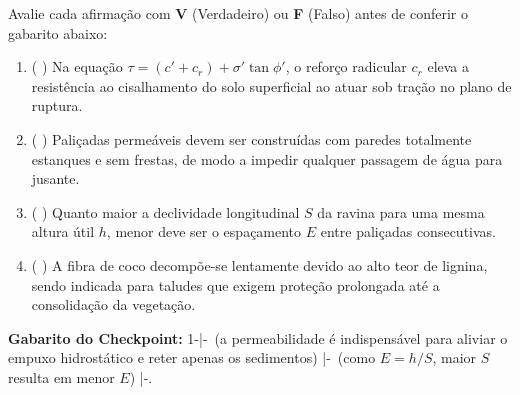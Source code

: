 \begin{boxTeste}
Avalie cada afirmação com \textbf{V} (Verdadeiro) ou \textbf{F} (Falso) antes de conferir o gabarito abaixo:
\begin{enumerate}[leftmargin=1.6em, itemsep=3pt]
  \item ( \quad ) Na equação $\tau = (c' + c_r) + \sigma'\tan\phi'$, o reforço radicular $c_r$ eleva a resistência ao cisalhamento do solo superficial ao atuar sob tração no plano de ruptura.
  \item ( \quad ) Paliçadas permeáveis devem ser construídas com paredes totalmente estanques e sem frestas, de modo a impedir qualquer passagem de água para jusante.
  \item ( \quad ) Quanto maior a declividade longitudinal $S$ da ravina para uma mesma altura útil $h$, menor deve ser o espaçamento $E$ entre paliçadas consecutivas.
  \item ( \quad ) A fibra de coco decompõe-se lentamente devido ao alto teor de lignina, sendo indicada para taludes que exigem proteção prolongada até a consolidação da vegetação.
\end{enumerate}
\vspace{4pt}
{\footnotesize\textbf{Gabarito do Checkpoint:} 1-\V \quad|-\F\ (a permeabilidade é indispensável para aliviar o empuxo hidrostático e reter apenas os sedimentos) \quad|-\V\ (como $E = h/S$, maior $S$ resulta em menor $E$) \quad|-\V.}
\end{boxTeste}

